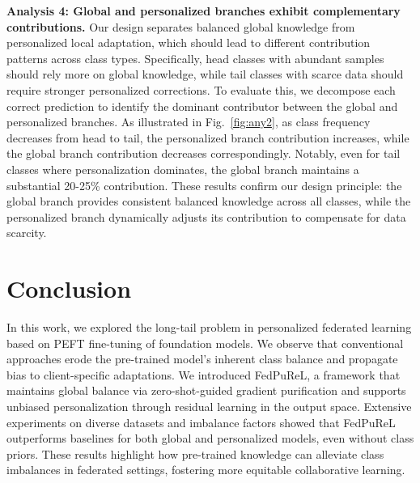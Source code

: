 \documentclass[10pt,twocolumn,letterpaper]{article}
\begin{document}
\noindent \textbf{\hypertarget{analysis:4}{Analysis 4}: Global and personalized branches exhibit complementary contributions.} 
Our design separates balanced global knowledge from personalized local adaptation, which should lead to different contribution patterns across class types. Specifically, head classes with abundant samples should rely more on global knowledge, while tail classes with scarce data should require stronger personalized corrections. To evaluate this, we decompose each correct prediction to identify the dominant contributor between the global and personalized branches. As illustrated in Fig.~\ref{fig:any2}, as class frequency decreases from head to tail, the personalized branch contribution increases, while the global branch contribution decreases correspondingly. Notably, even for tail classes where personalization dominates, the global branch maintains a substantial 20-25\% contribution. These results confirm our design principle: the global branch provides consistent balanced knowledge across all classes, while the personalized branch dynamically adjusts its contribution to compensate for data scarcity.

 



\section{Conclusion}

In this work, we explored the long-tail problem in personalized federated learning based on PEFT fine-tuning of foundation models. We observe that conventional approaches erode the pre-trained model’s inherent class balance and propagate bias to client-specific adaptations. We introduced FedPuReL, a framework that maintains global balance via zero-shot-guided gradient purification and supports unbiased personalization through residual learning in the output space. Extensive experiments on diverse datasets and imbalance factors showed that FedPuReL outperforms baselines for both global and personalized models, even without class priors. These results highlight how pre-trained knowledge can alleviate class imbalances in federated settings, fostering more equitable collaborative learning. 
\end{document}
